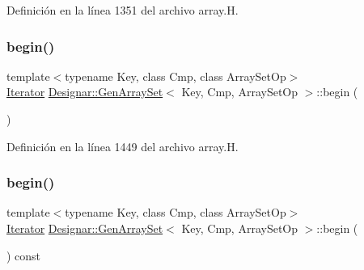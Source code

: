 Definición en la línea 1351 del archivo array.\+H.

\mbox{\label{class_designar_1_1_gen_array_set_af736c7af596752d636881374f0d45f4c}} 
\subsubsection{\texorpdfstring{begin()}{begin()}\hspace{0.1cm}{\footnotesize\ttfamily [1/2]}}
{\footnotesize\ttfamily template$<$typename Key, class Cmp, class Array\+Set\+Op$>$ \\
\hyperlink{class_designar_1_1_gen_array_set_1_1_iterator}{Iterator} \hyperlink{class_designar_1_1_gen_array_set}{Designar\+::\+Gen\+Array\+Set}$<$ Key, Cmp, Array\+Set\+Op $>$\+::begin (\begin{DoxyParamCaption}{ }\end{DoxyParamCaption})\hspace{0.3cm}{\ttfamily [inline]}}



Definición en la línea 1449 del archivo array.\+H.

\mbox{\label{class_designar_1_1_gen_array_set_a9bccd51f6d73a05400361cf5deff8aac}} 
\subsubsection{\texorpdfstring{begin()}{begin()}\hspace{0.1cm}{\footnotesize\ttfamily [2/2]}}
{\footnotesize\ttfamily template$<$typename Key, class Cmp, class Array\+Set\+Op$>$ \\
\hyperlink{class_designar_1_1_gen_array_set_1_1_iterator}{Iterator} \hyperlink{class_designar_1_1_gen_array_set}{Designar\+::\+Gen\+Array\+Set}$<$ Key, Cmp, Array\+Set\+Op $>$\+::begin (\begin{DoxyParamCaption}{ }\end{DoxyParamCaption}) const\hspace{0.3cm}{\ttfamily [inline]}}



